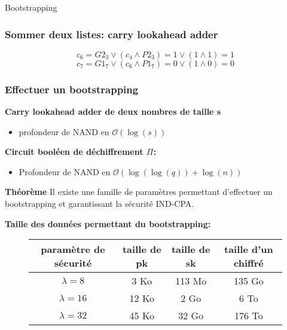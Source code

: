 \documentclass[10pt,xcolor={usenames,dvipsnames}]{beamer}
\begin{document}
\begin{section}{Bootstrapping}

\begin{frame} 
\frametitle{Sommer deux listes: carry lookahead adder}
  \begin{figure}
    \begin{center}
      \begin{tikzpicture}[scale = 0.7, transform shape]
      	
      \end{tikzpicture}
    \end{center}
  \end{figure}
\[c_6 = G2_3 \vee \left( c_4 \wedge P2_3\right) = 1 \vee \left( 1 \wedge 1 \right) = 1 \]
\[c_7 = G1_7 \vee \left( c_6 \wedge P1_7\right) = 0 \vee \left( 1 \wedge 0 \right) = 0 \]
\end{frame} 




\begin{frame} 
\frametitle{Effectuer un bootstrapping}



\textbf{Carry lookahead adder de deux nombres de taille s}
\begin{itemize}
\item profondeur de NAND  en $\mathcal{O}(\log(s))$
\end{itemize}

\textbf{Circuit booléen de déchiffrement $\Pi$:}
\begin{itemize}
\item Profondeur de NAND en $\mathcal{O}(\log(\log(q)) + \log(n))$
\end{itemize}

\textbf{Théorème}
Il existe une famille de paramètres permettant d'effectuer un bootstrapping et garantissant la sécurité  IND-CPA.
\pause

\textbf{Taille des données permettant du bootstrapping:}
\begin{figure}
\begin{tabular}{|c|c|c|c|}
\hline
paramètre de sécurité & taille de pk & taille de sk & taille d'un chiffré \\
\hline
$\lambda = 8$ & 3 Ko & 113 Mo & 135 Go \\
\hline
$\lambda = 16$ & 12 Ko & 2 Go & 6 To \\
\hline
$\lambda = 32$ & 45 Ko & 32 Go & 176 To \\
\hline
\end{tabular}
\end{figure}
\end{frame}

\end{section}
\end{document}
